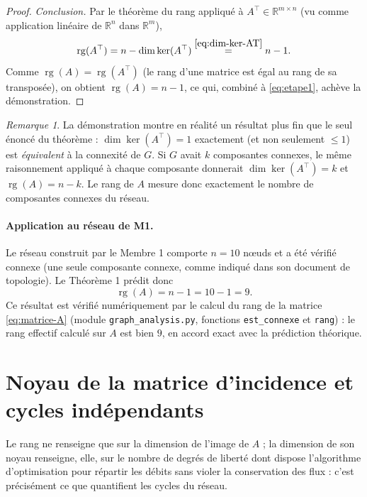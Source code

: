 \documentclass[11pt,a4paper]{article}
\theoremstyle{plain}
\theoremstyle{definition}
\theoremstyle{remark}
\newtheorem{remarque}{Remarque}
\begin{document}
\begin{proof}
\medskip
\noindent\textit{Conclusion.} Par le théorème du rang appliqué à
$A^\top \in \mathbb{R}^{m \times n}$ (vu comme application linéaire de
$\mathbb{R}^n$ dans $\mathbb{R}^m$),
\[
\operatorname{rg}(A^\top) = n - \dim \ker(A^\top) \overset{\eqref{eq:dim-ker-AT}}{=} n - 1.
\]
Comme $\operatorname{rg}(A) = \operatorname{rg}(A^\top)$ (le rang d'une
matrice est égal au rang de sa transposée), on obtient
$\operatorname{rg}(A) = n - 1$, ce qui, combiné à \eqref{eq:etape1},
achève la démonstration.
\end{proof}

\begin{remarque}
La démonstration montre en réalité un résultat plus fin que le seul énoncé
du théorème : $\dim \ker(A^\top) = 1$ exactement (et non seulement
$\le 1$) est \emph{équivalent} à la connexité de $G$. Si $G$ avait $k$
composantes connexes, le même raisonnement appliqué à chaque composante
donnerait $\dim \ker(A^\top) = k$ et $\operatorname{rg}(A) = n - k$. Le
rang de $A$ mesure donc exactement le nombre de composantes connexes du
réseau.
\end{remarque}

\paragraph{Application au réseau de M1.}
Le réseau construit par le Membre 1 comporte $n = 10$ nœuds et a été
vérifié connexe (une seule composante connexe, comme indiqué dans son
document de topologie). Le Théorème 1 prédit donc
\begin{equation}
\operatorname{rg}(A) = n - 1 = 10 - 1 = 9.
\end{equation}
Ce résultat est vérifié numériquement par le calcul du rang de la matrice
\eqref{eq:matrice-A} (module \texttt{graph\_analysis.py}, fonctions
\texttt{est\_connexe} et \texttt{rang}) : le rang effectif calculé sur $A$
est bien $9$, en accord exact avec la prédiction théorique.

\section{Noyau de la matrice d'incidence et cycles indépendants}

Le rang ne renseigne que sur la dimension de l'image de $A$ ; la dimension
de son noyau renseigne, elle, sur le nombre de degrés de liberté dont
dispose l'algorithme d'optimisation pour répartir les débits sans violer la
conservation des flux : c'est précisément ce que quantifient les cycles du
réseau.
\end{document}
